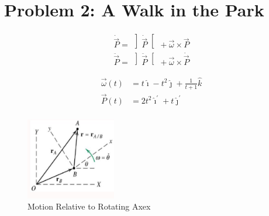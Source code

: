 \documentclass[conference]{IEEEtran}
\begin{document}
\section{Problem 2: A Walk in the Park}
\begin{gather}
    \dot{\vec{P}} = \, \left]\dot{\vec{P}}\right[ \, + \vec{\omega}\times\vec{P} \\
        \ddot{\vec{P}} = \, \left]\ddot{\vec{P}}\right[ \, + \vec{\omega}\times\dot{\vec{P}}
\end{gather}

\begin{align*}
    \vec{\omega}(t) & = t \hat{\imath} - t^2 \hat{\jmath} + \frac{1}{t+1} \hat{k} \\
    \vec{P}(t)      & = 2t^2 \hat{\imath}^\prime + t \hat{\jmath}^\prime          \\
\end{align*}

\begin{figure}[htbp]
    \centerline{\includegraphics[width=0.35\textwidth]{figures/prob2a.jpeg}}
    \caption{Motion Relative to Rotating Axex \cite{b4}}
    \label{fig:prob2a}
\end{figure}
\end{document}
